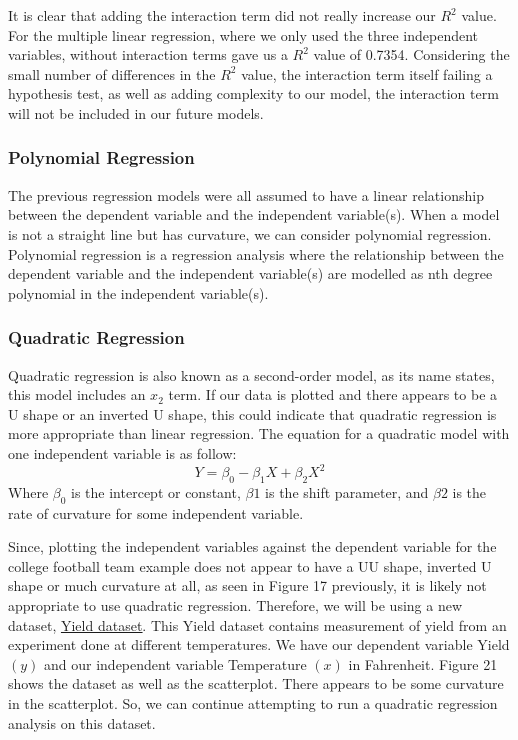 \documentclass[a4paper,12pt]{report}
\newcommand{\link}[2]{\hyperlink{#1}{\underline{#2}}}
\begin{document}
It is clear that adding the interaction term did not really increase our $R^2$ value. For the multiple linear regression, where we only used the three independent variables, without interaction terms gave us a $R^2$ value of 0.7354. Considering the small number of differences in the $R^2$ value, the interaction term itself failing a hypothesis test, as well as adding complexity to our model, the interaction term will not be included in our future models.

\subsubsection{Polynomial Regression}
The previous regression models were all assumed to have a linear relationship between the dependent variable and the independent variable(s). When a model is not a straight line but has curvature, we can consider polynomial regression. Polynomial regression is a regression analysis where the relationship between the dependent variable and the independent variable(s) are modelled as nth degree polynomial in the independent variable(s).
 
\subsubsection{Quadratic Regression}
Quadratic regression is also known as a second-order model, as its name states, this model includes an $x_2$ term. If our data is plotted and there appears to be a U shape or an inverted U shape, this could indicate that quadratic regression is more appropriate than linear regression. The equation for a quadratic model with one independent variable is as follow:
$$Y=\beta_0-\beta_1X+\beta_2X^2$$
Where $\beta_0$ is the intercept or constant, $\beta1$ is the shift parameter, and $\beta2$ is the rate of curvature for some independent variable.

Since, plotting the independent variables against the dependent variable for the college football team example does not appear to have a UU shape, inverted U shape or much curvature at all, as seen in Figure 17 previously, it is likely not appropriate to use quadratic regression. Therefore, we will be using a new dataset, \link{https://online.stat.psu.edu/stat462/node/159/}{Yield dataset}. This Yield dataset contains measurement of yield from an experiment done at different temperatures. We have our dependent variable Yield $(y)$ and our independent variable Temperature $(x)$ in Fahrenheit. Figure 21 shows the dataset as well as the scatterplot. There appears to be some curvature in the scatterplot. So, we can continue attempting to run a quadratic regression analysis on this dataset.
\end{document}

